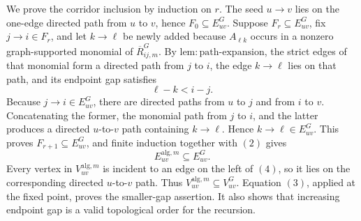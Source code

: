 We prove the corridor inclusion by induction on \(r\).  The seed \(u\to v\) lies on the one-edge directed path from \(u\) to \(v\), hence \(F_0\subseteq E_{uv}^{G}\).  Suppose \(F_r\subseteq E_{uv}^{G}\), fix \(j\to i\in F_r\), and let \(k\to\ell\) be newly added because \(A_{\ell k}\) occurs in a nonzero graph-supported monomial of \(\overline R^{G}_{ij,m}\).  By \(\mathrm{lem{:}path\mbox{-}expansion}\), the strict edges of that monomial form a directed path from \(j\) to \(i\), the edge \(k\to\ell\) lies on that path, and its endpoint gap satisfies
\[
 \ell-k<i-j.
\tag{3}
\]
Because \(j\to i\in E_{uv}^{G}\), there are directed paths from \(u\) to \(j\) and from \(i\) to \(v\).  Concatenating the former, the monomial path from \(j\) to \(i\), and the latter produces a directed \(u\)-to-\(v\) path containing \(k\to\ell\).  Hence \(k\to\ell\in E_{uv}^{G}\).  This proves \(F_{r+1}\subseteq E_{uv}^{G}\), and finite induction together with \((2)\) gives
\[
 E_{uv}^{\mathrm{alg},m}\subseteq E_{uv}^{G}.
\tag{4}
\]
Every vertex in \(V_{uv}^{\mathrm{alg},m}\) is incident to an edge on the left of \((4)\), so it lies on the corresponding directed \(u\)-to-\(v\) path.  Thus \(V_{uv}^{\mathrm{alg},m}\subseteq V_{uv}^{G}\).  Equation \((3)\), applied at the fixed point, proves the smaller-gap assertion.  It also shows that increasing endpoint gap is a valid topological order for the recursion.

